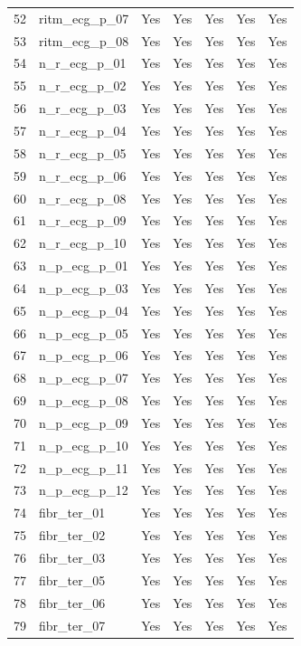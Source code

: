 \begin{longtable}{rlccccc}
52 & ritm\_ecg\_p\_07 & Yes & Yes & Yes & Yes & Yes \\
53 & ritm\_ecg\_p\_08 & Yes & Yes & Yes & Yes & Yes \\
54 & n\_r\_ecg\_p\_01 & Yes & Yes & Yes & Yes & Yes \\
55 & n\_r\_ecg\_p\_02 & Yes & Yes & Yes & Yes & Yes \\
56 & n\_r\_ecg\_p\_03 & Yes & Yes & Yes & Yes & Yes \\
57 & n\_r\_ecg\_p\_04 & Yes & Yes & Yes & Yes & Yes \\
58 & n\_r\_ecg\_p\_05 & Yes & Yes & Yes & Yes & Yes \\
59 & n\_r\_ecg\_p\_06 & Yes & Yes & Yes & Yes & Yes \\
60 & n\_r\_ecg\_p\_08 & Yes & Yes & Yes & Yes & Yes \\
61 & n\_r\_ecg\_p\_09 & Yes & Yes & Yes & Yes & Yes \\
62 & n\_r\_ecg\_p\_10 & Yes & Yes & Yes & Yes & Yes \\
63 & n\_p\_ecg\_p\_01 & Yes & Yes & Yes & Yes & Yes \\
64 & n\_p\_ecg\_p\_03 & Yes & Yes & Yes & Yes & Yes \\
65 & n\_p\_ecg\_p\_04 & Yes & Yes & Yes & Yes & Yes \\
66 & n\_p\_ecg\_p\_05 & Yes & Yes & Yes & Yes & Yes \\
67 & n\_p\_ecg\_p\_06 & Yes & Yes & Yes & Yes & Yes \\
68 & n\_p\_ecg\_p\_07 & Yes & Yes & Yes & Yes & Yes \\
69 & n\_p\_ecg\_p\_08 & Yes & Yes & Yes & Yes & Yes \\
70 & n\_p\_ecg\_p\_09 & Yes & Yes & Yes & Yes & Yes \\
71 & n\_p\_ecg\_p\_10 & Yes & Yes & Yes & Yes & Yes \\
72 & n\_p\_ecg\_p\_11 & Yes & Yes & Yes & Yes & Yes \\
73 & n\_p\_ecg\_p\_12 & Yes & Yes & Yes & Yes & Yes \\
74 & fibr\_ter\_01 & Yes & Yes & Yes & Yes & Yes \\
75 & fibr\_ter\_02 & Yes & Yes & Yes & Yes & Yes \\
76 & fibr\_ter\_03 & Yes & Yes & Yes & Yes & Yes \\
77 & fibr\_ter\_05 & Yes & Yes & Yes & Yes & Yes \\
78 & fibr\_ter\_06 & Yes & Yes & Yes & Yes & Yes \\
79 & fibr\_ter\_07 & Yes & Yes & Yes & Yes & Yes \\

\end{longtable}
